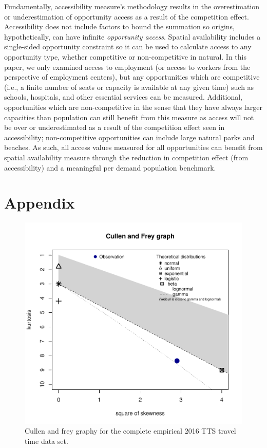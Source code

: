 \documentclass[]{elsarticle} %
\begin{document}
Fundamentally, accessibility measure's methodology results in the
overestimation or underestimation of opportunity access as a result of
the competition effect. Accessibility does not include factors to bound
the summation so origins, hypothetically, can have infinite
\emph{opportunity access}. Spatial availability includes a single-sided
opportunity constraint so it can be used to calculate access to any
opportunity type, whether competitive or non-competitive in natural. In
this paper, we only examined access to employment (or access to workers
from the perspective of employment centers), but any opportunities which
are competitive (i.e., a finite number of seats or capacity is available
at any given time) such as schools, hospitals, and other essential
services can be measured. Additional, opportunities which are
non-competitive in the sense that they have always larger capacities
than population can still benefit from this measure as access will not
be over or underestimated as a result of the competition effect seen in
accessibility; non-competitive opportunities can include large natural
parks and beaches. As such, all access values measured for all
opportunities can benefit from spatial availability measure through the
reduction in competition effect (from accessibility) and a meaningful
per demand population benchmark.

\hypertarget{appendix}{%
\section{Appendix}\label{appendix}}

\begin{figure}
\includegraphics[width=1\linewidth]{Spatial-Availability_files/figure-latex/plot-cullen-frey-1} \caption{\label{fig:plot-cullen-frey}Cullen and frey graphy for the complete empirical 2016 TTS travel time data set.}\label{fig:plot-cullen-frey}
\end{figure}
\end{document}
